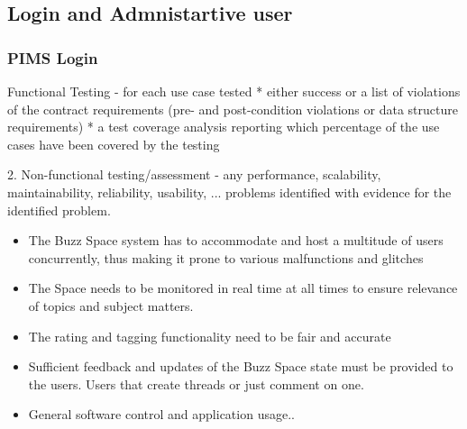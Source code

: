 \subsection{Login and Admnistartive user}
	\subsubsection*{PIMS Login}
		Functional Testing
		- for each use case tested
		* either success or a list of violations of the contract requirements (pre- and post-condition violations or data structure requirements)
		* a test coverage analysis reporting which percentage of the use cases have been covered by the testing
		
		2. Non-functional testing/assessment
		- any performance, scalability, maintainability, reliability, usability, ... problems identified with evidence for the identified problem.
	
				
					\begin{itemize}
							\item The Buzz Space system has to accommodate and host a multitude of users concurrently, thus making it prone to various malfunctions and glitches
							
							\item The Space needs to be monitored in real time at all times to ensure relevance of topics and subject matters.
							\item The rating and tagging functionality need to be fair and accurate
							
							\item Sufficient feedback and updates of the Buzz Space state must be provided to the users. Users that create threads or just comment on one.
							
							\item General software control and application usage..
						 \end{itemize}